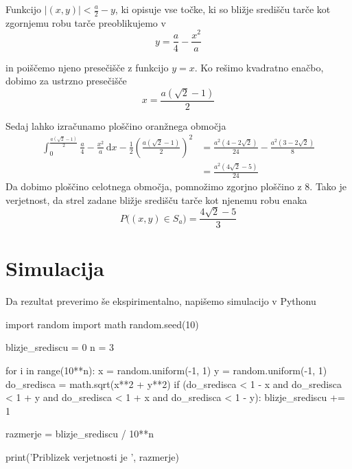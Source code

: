 \documentclass{amsart}
\theoremstyle{definition} %
\theoremstyle{plain} %
\begin{document}
Funkcijo $|(x,y)| < \frac{a}{2} - y$, ki opisuje vse točke, ki so bližje središču tarče kot
zgornjemu robu tarče preoblikujemo v 
\begin{equation*}
    y = \frac{a}{4} - \frac{x^2}{a}
\end{equation*}

in poiščemo njeno presečišče z funkcijo $y = x$. Ko rešimo kvadratno enačbo,
dobimo za ustrzno presečišče
\begin{equation*}
    x=\frac{a(\sqrt{2}-1)}{2}
\end{equation*}

Sedaj lahko izračunamo ploščino oranžnega območja
\begin{align*}
    \int_{0}^{\frac{a(\sqrt{2}-1)}{2}} \frac{a}{4} - \frac{x^2}{a} \, \mathrm{d}x - \frac{1}{2}(\frac{a(\sqrt{2}-1)}{2})^2
    &= \frac{a^2(4-2\sqrt{2})}{24} - \frac{a^2(3-2\sqrt{2})}{8} \\
    &= \frac{a^2(4\sqrt{2}-5)}{24}
\end{align*}
Da dobimo ploščino celotnega območja, pomnožimo zgorjno ploščino z $8$. Tako je verjetnost, da strel zadane bližje središču
tarče kot njenemu robu enaka
\begin{equation*}
    P\big((x,y) \in S_a\big) = \frac{4\sqrt{2}-5}{3}
\end{equation*}

\pagebreak

\section{Simulacija}

Da rezultat preverimo še ekspirimentalno, napišemo simulacijo v Pythonu

\begin{python}
    import random
    import math
    random.seed(10)
    
    blizje_srediscu = 0
    n = 3
    
    for i in range(10**n):
        x = random.uniform(-1, 1)
        y = random.uniform(-1, 1)
        do_sredisca = math.sqrt(x**2 + y**2)
        if (do_sredisca < 1 - x and do_sredisca < 1 + y and
            do_sredisca < 1 + x  and do_sredisca < 1 - y):
            blizje_srediscu += 1
    
        razmerje = blizje_srediscu / 10**n
    
    print('Priblizek verjetnosti je ', razmerje)
\end{python}
\end{document}

